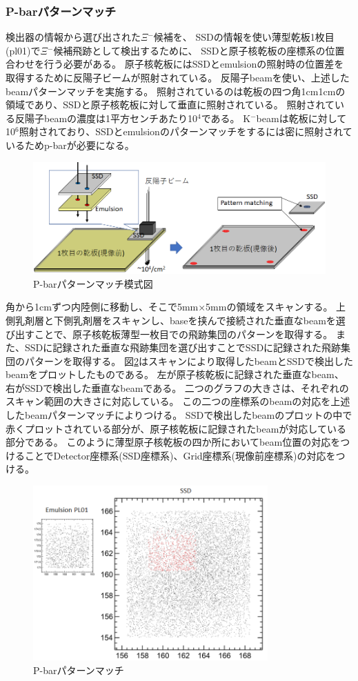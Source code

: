 \documentclass[12pt,a4paper]{jarticle}
\begin{document}
\subsubsection{P-barパターンマッチ}
検出器の情報から選び出された$\Xi$$^-$候補を、
SSDの情報を使い薄型乾板1枚目(pl01)で$\Xi$$^-$候補飛跡として検出するために、
SSDと原子核乾板の座標系の位置合わせを行う必要がある。
原子核乾板にはSSDとemulsionの照射時の位置差を取得するために反陽子ビームが照射されている。
反陽子beamを使い、上述したbeamパターンマッチを実施する。
照射されているのは乾板の四つ角1cm1cmの領域であり、SSDと原子核乾板に対して垂直に照射されている。
照射されている反陽子beamの濃度は1平方センチあたり10$^4$である。
K$^-$beamは乾板に対して10$^6$照射されており、SSDとemulsionのパターンマッチをするには密に照射されているためp-barが必要になる。
\begin{figure}[htbp]
  \centering
     \includegraphics[width=140mm]{pbar_mosikizu.png}
  \caption{P-barパターンマッチ模式図\label{fig:pbar_mosikizu}}
\end{figure}
\par
角から1cmずつ内陸側に移動し、そこで5mm×5mmの領域をスキャンする。
上側乳剤層と下側乳剤層をスキャンし、baseを挟んで接続された垂直なbeamを選び出すことで、原子核乾板薄型一枚目での飛跡集団のパターンを取得する。
また、SSDに記録された垂直な飛跡集団を選び出すことでSSDに記録された飛跡集団のパターンを取得する。
図\ref{fig:pbar_pattern}はスキャンにより取得したbeamとSSDで検出したbeamをプロットしたものである。
左が原子核乾板に記録された垂直なbeam、右がSSDで検出した垂直なbeamである。
二つのグラフの大きさは、それぞれのスキャン範囲の大きさに対応している。
この二つの座標系のbeamの対応を上述したbeamパターンマッチによりつける。
SSDで検出したbeamのプロットの中で赤くプロットされている部分が、原子核乾板に記録されたbeamが対応している部分である。
このように薄型原子核乾板の四か所においてbeam位置の対応をつけることでDetector座標系(SSD座標系)、Grid座標系(現像前座標系)の対応をつける。
\begin{figure}[htbp]
  \centering
     \includegraphics[width=90mm]{pbar_pattern.png}
  \caption{P-barパターンマッチ\label{fig:pbar_pattern}}
\end{figure}
\newpage
\end{document}
